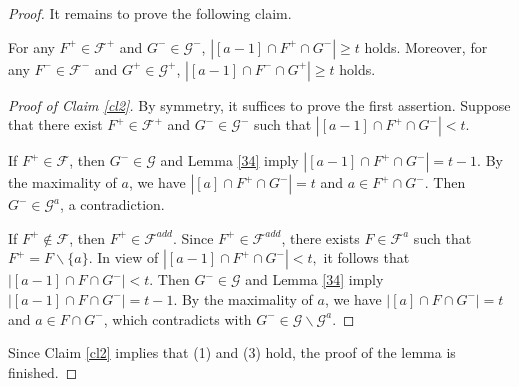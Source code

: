 \documentclass[10pt,a4paper]{amsart}
\begin{document}
\begin{proof}
It remains  to prove the following claim. 
 \begin{claim}\label{cl2}
  For any $F^+\in\mathcal{F}^+$ and $G^-\in\mathcal{G}^-$, 
     $
    |[a-1] \cap F^+\cap G^-|\geq t
     $
     holds.
Moreover, for any $F^-\in\mathcal{F}^-$ and $G^+\in\mathcal{G}^+$, 
     $
    |[a-1] \cap F^-\cap G^+|\geq t
     $
     holds.
    \end{claim}
    \begin{proof}[Proof of Claim \ref{cl2}]
By symmetry, it suffices to prove the first assertion.
    Suppose that there exist $F^+\in\mathcal{F}^+$ and $G^-\in\mathcal{G}^-$ such that
     $
    |[a-1] \cap F^+\cap G^-|< t.
     $


  If $F^+\in\mathcal{F}$,  then $G^-\in\mathcal{G}$ and
Lemma \ref{34} imply $
    |[a-1] \cap F^+\cap G^-|=t-1.
     $
By the maximality of $a$, we have $
    |[a] \cap  F^+\cap G^-|=t
     $
and $a\in F^+\cap G^-$.
Then $ G^-\in \mathcal{G}^a$,  a contradiction.

If $F^+\notin\mathcal{F}$, then $F^+\in\mathcal{F}^{add}$.  Since  $F^+\in\mathcal{F}^{add}$, there exists 
 $F\in\mathcal{F}^a$ such that
        $ F^+=F\backslash \{a\}$.
In view of    $
          |[a-1] \cap  F^+\cap G^-|< t,
        $
it follows that
      $
        \left|[a-1]\cap F\cap G^- \right|<t.
       $
Then $G^-\in\mathcal{G}$ and
Lemma \ref{34} imply 
$
        \left|[a-1]\cap F\cap G^- \right|=t-1.
       $
By the maximality of $a$, we have $
    |[a] \cap F\cap G^-|=t
     $
and $a\in  F\cap G^-$,
       which contradicts with  $ G^-\in \mathcal{G}\backslash\mathcal{G}^a$.
    \end{proof}

Since  Claim \ref{cl2} implies that (1) and (3) hold, the proof of the lemma is finished. 
\end{proof}
\end{document}
